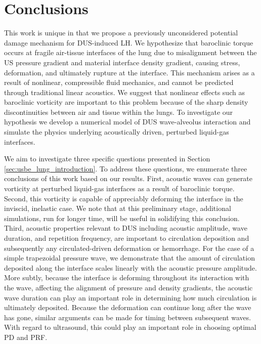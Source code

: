 \section{Conclusions}
\label{sec:usbe_lung_conclusions}
This work is unique in that we propose a previously unconsidered
potential damage mechanism for \ac{DUS}-induced \ac{LH}. We
hypothesize that baroclinic torque occurs at fragile air-tissue
interfaces of the lung due to misalignment between the \ac{US}
pressure gradient and material interface density gradient, causing
stress, deformation, and ultimately rupture at the interface. This
mechanism arises as a result of nonlinear, compressible fluid
mechanics, and cannot be predicted through traditional linear
acoustics. We suggest that nonlinear effects such as baroclinic
vorticity are important to this problem because of the sharp density
discontinuities between air and tissue within the lungs. To
investigate our hypothesis we develop a numerical model of \ac{DUS}
wave-alveolus interaction and simulate the physics underlying
acoustically driven, perturbed liquid-gas interfaces.

We aim to investigate three specific questions presented in Section
\ref{sec:usbe_lung_introduction}. To address these questions, we
enumerate three conclusions of this work based on our results.  First,
acoustic waves can generate vorticity at perturbed liquid-gas
interfaces as a result of baroclinic torque. Second, this vorticity is
capable of appreciably deforming the interface in the inviscid,
inelastic case. We note that at this preliminary stage, additional
simulations, run for longer time, will be useful in solidifying this
conclusion.  Third, acoustic properties relevant to \ac{DUS} including
acoustic amplitude, wave duration, and repetition frequency, are
important to circulation deposition and subsequently any
circulated-driven deformation or hemorrhage. For the case of a simple
trapezoidal pressure wave, we demonstrate that the amount of
circulation deposited along the interface scales linearly with the
acoustic pressure amplitude. More subtly, because the interface is
deforming throughout its interaction with the wave, affecting the
alignment of pressure and density gradients, the acoustic wave
duration can play an important role in determining how much
circulation is ultimately deposited. Because the deformation can
continue long after the wave has gone, similar arguments can be made
for timing between subsequent waves. With regard to ultrasound, this
could play an important role in choosing optimal \acs{PD} and
\acs{PRF}.
